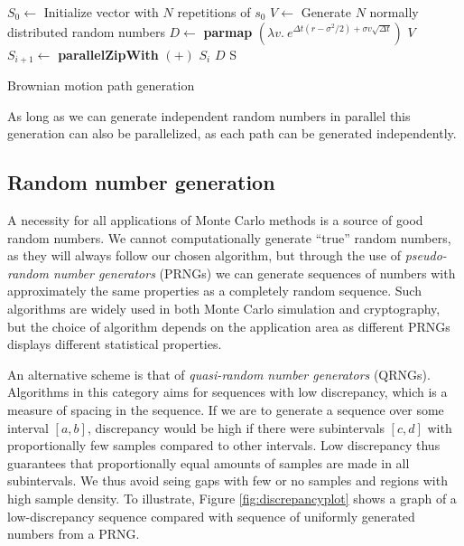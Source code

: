 \begin{algorithm}
  \begin{algorithmic}
    \State $S_0 \gets$ Initialize vector with $N$ repetitions of $s_0$
      \State $V \gets$ Generate $N$ normally distributed random numbers
      \State $D \gets$ \textbf{parmap} $(\lambda v.\ e^{\Delta t(r-\sigma^2/2) + \sigma v\sqrt{\Delta t}})$ $V$
      \State $S_{i+1} \gets$ \textbf{parallelZipWith} $(+)$ $S_{i}$ $D$
    \EndFor
    \State \Return S
    \EndFunction
  \end{algorithmic}
  \caption{Brownian motion path generation}
  \label{alg:lsm-pathgeneration}
\end{algorithm}


As long as we can generate independent random numbers in parallel this
generation can also be parallelized, as each path can be generated
independently.

\subsection{Random number generation}
A necessity for all applications of Monte Carlo methods is a source of
good random numbers. We cannot computationally generate ``true'' random
numbers, as they will always follow our chosen algorithm, but through
the use of \emph{pseudo-random number generators} (PRNGs) we can
generate sequences of numbers with approximately the same properties
as a completely random sequence. Such algorithms are widely used in both
Monte Carlo simulation and cryptography, but the choice of algorithm
depends on the application area as different PRNGs displays different
statistical properties.

An alternative scheme is that of \emph{quasi-random number generators}
(QRNGs). Algorithms in this category aims for sequences with low
discrepancy, which is a measure of spacing in the sequence. If we are
to generate a sequence over some interval $[a,b]$, discrepancy would
be high if there were subintervals $[c,d]$ with proportionally few
samples compared to other intervals. Low discrepancy thus guarantees
that proportionally equal amounts of samples are made in all
subintervals. We thus avoid seing gaps with few or no samples and
regions with high sample density. To illustrate, Figure
\ref{fig:discrepancyplot} shows a graph of a low-discrepancy sequence
compared with sequence of uniformly generated numbers from a PRNG.

